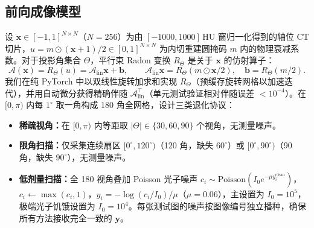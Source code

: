 \documentclass[11pt,UTF8]{ctexart}
\newcommand{\A}{\mathcal{A}}
\newcommand{\x}{\bm{x}}
\newcommand{\y}{\bm{y}}
\begin{document}
\subsection{前向成像模型}
设 $\x\in[-1,1]^{N\times N}$（$N{=}256$）为由 $[-1000,1000]$\,HU 窗归一化得到的轴位 CT 切片，$u = m\odot(\x+1)/2 \in [0,1]^{N\times N}$ 为内切重建圆掩码 $m$ 内的物理衰减系数。对于投影角集合 $\Theta$，平行束 Radon 变换 $R_\Theta$ 是关于 $\x$ 的仿射算子：
\begin{equation}
  \A(\x) = R_\Theta(u) = \A_{\mathrm{lin}}\x + \bm{b},
  \qquad \A_{\mathrm{lin}}\x = R_\Theta(m\odot\x/2),
  \quad \bm{b} = R_\Theta(m/2).
\end{equation}
我们在纯 PyTorch 中以双线性旋转加求和实现 $R_\Theta$（预缓存旋转网格以加速迭代），并用自动微分获得精确伴随 $\A_{\mathrm{lin}}^\top$（单元测试验证相对伴随误差 $<10^{-4}$）。在 $[0,\pi)$ 内每 $1^\circ$ 取一角构成 180 角全网格，设计三类退化协议：
\begin{itemize}[leftmargin=*,nosep]
  \item \textbf{稀疏视角：}在 $[0,\pi)$ 内等距取 $|\Theta|\in\{30,60,90\}$ 个视角，无测量噪声。
  \item \textbf{限角扫描：}仅采集连续扇区 $[0^\circ,120^\circ)$（120 角，缺失 $60^\circ$）或 $[0^\circ,90^\circ)$（90 角，缺失 $90^\circ$），无测量噪声。
  \item \textbf{低剂量扫描：}全 180 视角叠加 Poisson 光子噪声 $c_i\sim\mathrm{Poisson}(I_0 e^{-\mu y_i^{\mathrm{clean}}})$，$c_i\leftarrow\max(c_i,1)$，$y_i=-\log(c_i/I_0)/\mu$（$\mu{=}0.06$），主设置为 $I_0{=}10^5$，极端光子饥饿设置为 $I_0{=}10^4$。每张测试图的噪声按图像编号独立播种，确保所有方法接收完全一致的 $\y$。
\end{itemize}
\end{document}
